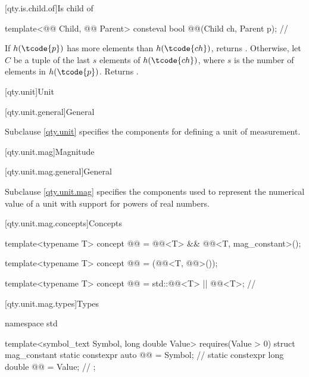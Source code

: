 [qty.is.child.of]{Is child of}

\begin{itemdecl}
template<@@ Child, @@ Parent>
consteval bool @@(Child ch, Parent p);  // \expos
\end{itemdecl}

\begin{itemdescr}
\pnum
\returns
If $h(\tcode{p})$ has more elements than $h(\tcode{ch})$, returns .
Otherwise, let $C$ be a tuple of the last $s$ elements of $h(\tcode{ch})$,
where $s$ is the number of elements in $h(\tcode{p})$.
Returns .
\end{itemdescr}

[qty.unit]{Unit}

[qty.unit.general]{General}

\pnum
Subclause \ref{qty.unit} specifies the components
for defining a unit of measurement.

[qty.unit.mag]{Magnitude}

[qty.unit.mag.general]{General}

\pnum
Subclause \ref{qty.unit.mag} specifies the components
used to represent the numerical value of a unit
with support for powers of real numbers.

[qty.unit.mag.concepts]{Concepts}

\begin{itemdecl}
template<typename T>
concept @@ = @@<T> && @@<T, mag_constant>();

template<typename T>
concept @@ = (@@<T, @@>());

template<typename T>
concept @@ = std::@@<T> || @@<T>;  // \expos
\end{itemdecl}

[qty.unit.mag.types]{Types}

\begin{codeblock}
namespace std {

template<symbol_text Symbol, long double Value>
  requires(Value > 0)
struct mag_constant {
  static constexpr auto @@ = Symbol;       // \expos
  static constexpr long double @@ = Value;  // \expos
};

}
\end{codeblock}

